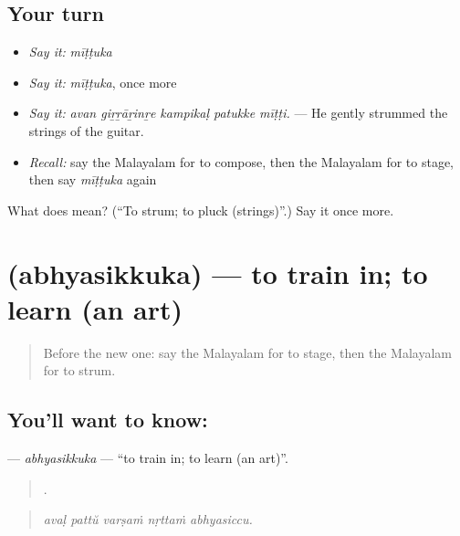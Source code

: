 \subsection*{Your turn}
\begin{itemize}
\raggedright
  \item \emph{Say it:} \emph{mīṭṭuka}
  \item \emph{Say it:} \emph{mīṭṭuka}, once more
  \item \emph{Say it:} \emph{avan giṟṟāṟinṟe kampikaḷ patukke mīṭṭi.} — He gently strummed the strings of the guitar.
  \item \emph{Recall:} say the Malayalam for to compose, then the Malayalam for to stage, then say \emph{mīṭṭuka} again
\end{itemize}

\begin{tcolorbox}[breakable,colback=teal!4,colframe=teal!35!black,title={Before you move on}]
What does  mean? (\textquotedblleft{}To strum; to pluck (strings)\textquotedblright{}.) Say it once more.
\end{tcolorbox}
\section[\texorpdfstring{\ml{അഭ്യസിക്കുക} (abhyasikkuka)}{അഭ്യസിക്കുക (abhyasikkuka)}]{ (abhyasikkuka) — to train in; to learn (an art)}

\label{lesson:ML-C564-abhyasikkuka}



\begin{quote}
Before the new one: say the Malayalam for to stage, then the Malayalam for to strum.
\end{quote}

\subsection*{You'll want to know: }
\textbf{} — \emph{abhyasikkuka} — \textquotedblleft{}to train in; to learn (an art)\textquotedblright{}.

\begin{quote}
    .
\end{quote}

\begin{quote}
\emph{avaḷ pattŭ varṣaṁ nṛttaṁ abhyasiccu.}
\end{quote}

